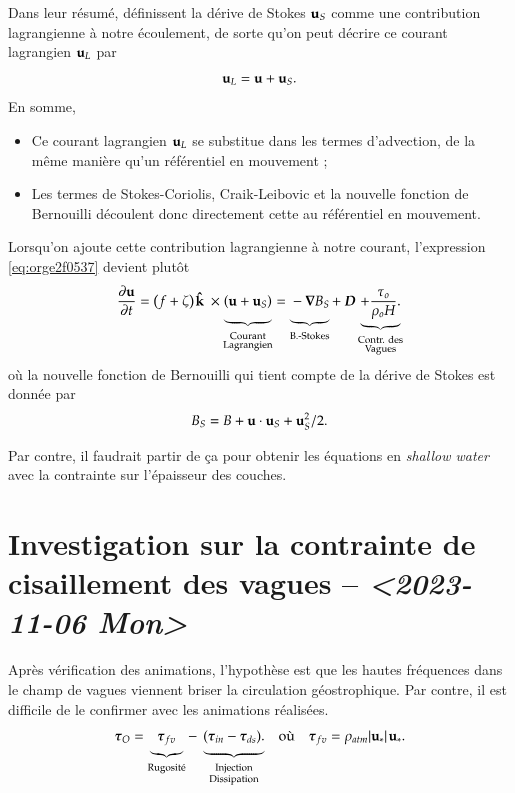 \documentclass[10pt]{article}
\numberwithin{equation}{section}
\newcommand{\kvf}{\vb{\hat{k}}}
\newcommand{\uu}{\vb{u}}
\newcommand{\tall}{\vphantom{A^{x^x}_p}}
\newcommand{\grande}{\vphantom{\frac{1}{xx}}}
\newcommand{\pt}{\hspace{1pt}} %
\begin{document}
Dans leur résumé,   définissent la dérive de Stokes \(\uu_S\) comme une contribution lagrangienne à notre écoulement, de sorte qu'on peut décrire ce courant lagrangien \(\uu_L\) par
\begin{equation}
   \uu_L = \uu + \uu_S.
\end{equation}
En somme, 
\begin{itemize}
\item Ce courant lagrangien \(\uu_L\) se substitue dans les termes d'advection, de la même manière qu'un référentiel en mouvement ;
\item Les termes de Stokes-Coriolis, Craik-Leibovic et la nouvelle fonction de Bernouilli découlent donc directement cette au référentiel en mouvement. \bigskip
\end{itemize}

Lorsqu'on ajoute cette contribution lagrangienne à notre courant, l'expression \ref{eq:orge2f0537} devient plutôt
\begin{equation}
   \pdv{\uu}{t} = \qty(f+\zeta)\pt \kvf\ \times\underbrace{\grande\qty(\uu + \uu_S)}_{\substack{\text{Courant} \\ \text{Lagrangien}}} = \underbrace{\grande-\gradient{B_S}}_\text{B.-Stokes} + \ \boldsymbol{D} \underbrace{+ \frac{\tau_o}{\rho_o H}.}_{\substack{\text{Contr. des} \\ \text{Vagues}}}
\end{equation}
où la nouvelle fonction de Bernouilli qui tient compte de la dérive de Stokes est donnée par
\begin{align}
   B_S = B + \uu\cdot\uu_S + \uu_S^2/2.
\end{align}

Par contre, il faudrait partir de ça pour obtenir les équations en \emph{shallow water} avec la contrainte sur l'épaisseur des couches.

\section{Investigation sur la contrainte de cisaillement des vagues -- \textit{<2023-11-06 Mon>}}
\label{sec:orgfcef669}

Après vérification des animations, l'hypothèse est que les hautes fréquences dans le champ de vagues viennent briser la circulation géostrophique.
Par contre, il est difficile de le confirmer avec les animations réalisées.
\begin{align}
\label{eq:org1480a3f}
   && \boldsymbol{\tau}_{O} = \underbrace{\tall\boldsymbol{\tau}_{fv}}_\text{Rugosité}  - \ \underbrace{(\tall\boldsymbol{\tau}_{in} - \boldsymbol{\tau}_{ds}).}_{\substack{\text{Injection} \\ \text{Dissipation}}}
   && \text{où}
   && \boldsymbol{\tau}_{fv} = \rho_{atm} \abs{\uu_*}\pt\uu_*. &&
\end{align}
\end{document}
